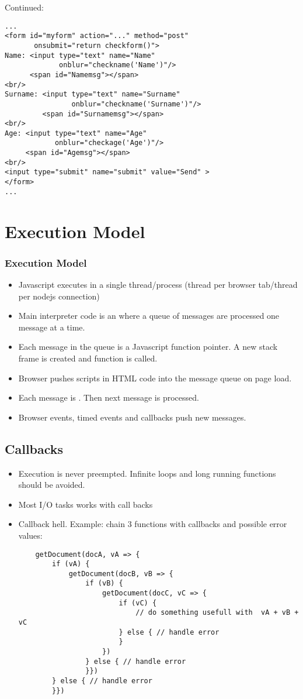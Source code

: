 \documentclass[trans,compress,xcolor=table]{beamer}
\begin{document}
\begin{frame}[fragile]
Continued:
\begin{lstlisting}
...
<form id="myform" action="..." method="post"
       onsubmit="return checkform()">
Name: <input type="text" name="Name" 
             onblur="checkname('Name')"/>
      <span id="Namemsg"></span>
<br/>
Surname: <input type="text" name="Surname" 
                onblur="checkname('Surname')"/>
         <span id="Surnamemsg"></span>
<br/>
Age: <input type="text" name="Age" 
            onblur="checkage('Age')"/>
     <span id="Agemsg"></span>
<br/>
<input type="submit" name="submit" value="Send" >
</form>
...
\end{lstlisting}
\end{frame}

\section{Execution Model}
\begin{frame}
\frametitle{Execution Model}
\begin{itemize}
\item Javascript executes in a single thread/process (thread per browser tab/thread per nodejs connection)
\item Main interpreter code is an  where a queue of messages are processed one message at a time. 
\item Each message in the queue is a Javascript function pointer. A new stack frame is created and function is called.
\item Browser pushes scripts in HTML code into the message queue on page load.
\item Each message is . Then next message is processed.
\item Browser events, timed events and callbacks push new messages.
\end{itemize}
\end{frame}

\subsection*{Callbacks}
\begin{frame}[fragile]
\begin{itemize}
\item Execution is never preempted. Infinite loops and long running functions should be avoided.
\item Most I/O tasks works with call backs
\item Callback hell. Example: chain 3 functions with callbacks and possible error values:
\begin{lstlisting}
	getDocument(docA, vA => {
		if (vA) {
			getDocument(docB, vB => {
				if (vB) {
					getDocument(docC, vC => {
						if (vC) {
							// do something usefull with  vA + vB + vC
						} else { // handle error 
						}
					})
				} else { // handle error 
				}})
		} else { // handle error
		}})
\end{lstlisting}
\end{itemize}
\end{frame}
\end{document}
